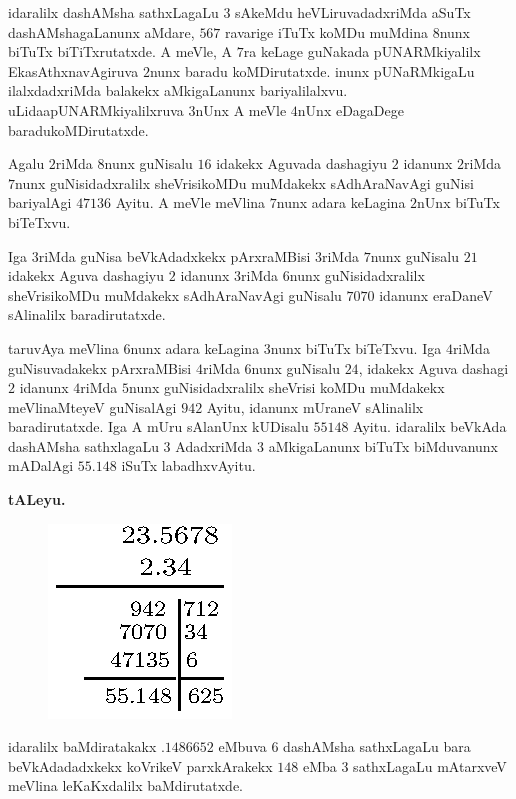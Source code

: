 idaralilx dashAMsha sathxLagaLu $3$ sAkeMdu heVLiruvadadxriMda aSuTx dashAMshagaLanunx aMdare, $567$ ravarige iTuTx koMDu muMdina $8$nunx biTuTx biTiTxrutatxde. A meVle, A $7$ra keLage guNakada pUNARMkiyalilx EkasAthxnavAgiruva $2$nunx baradu koMDirutatxde. inunx pUNaRMkigaLu ilalxdadxriMda balakekx aMkigaLanunx bariyalilalxvu. uLida\break apUNARMkiyalilxruva $3$nUnx A meVle $4$nUnx eDagaDege baradukoMDirutatxde.

Agalu $2$riMda $8$nunx guNisalu $16$ idakekx Aguvada dashagiyu $2$ idanunx $2$riMda $7$nunx guNisidadxralilx sheVrisikoMDu muMdakekx sAdhAraNavAgi guNisi bariyalAgi $47136$ Ayitu. A meVle meVlina $7$nunx adara keLagina $2$nUnx biTuTx biTeTxvu.

Iga $3$riMda guNisa beVkAdadxkekx pArxraMBisi $3$riMda $7$nunx guNisalu $21$ idakekx Aguva dashagiyu $2$ idanunx $3$riMda $6$nunx guNisidadxralilx sheVrisikoMDu muMdakekx sAdhAraNavAgi guNisalu $7070$ idanunx eraDaneV sAlinalilx baradirutatxde.

taruvAya meVlina $6$nunx adara keLagina $3$nunx biTuTx biTeTxvu. Iga $4$riMda guNisuvadakekx pArxraMBisi $4$riMda $6$nunx guNisalu $24$, idakekx Aguva dashagi $2$ idanunx $4$riMda $5$nunx guNisidadxralilx sheVrisi koMDu muMdakekx meVlinaMteyeV guNisalAgi $942$ Ayitu, idanunx mUraneV sAlinalilx baradirutatxde. Iga A mUru sAlanUnx kUDisalu $55148$ Ayitu. idaralilx beVkAda dashAMsha sathxlagaLu $3$ AdadxriMda $3$ aMkigaLanunx biTuTx biMduvanunx mADalAgi $55.148$ iSuTx labadhxvAyitu.

\newpage

\begin{center}
{\bf\large tALeyu.}
\end{center}

\begin{figure}[h]
\centering
\includegraphics[scale=1.3]{4.eps}
\end{figure}


idaralilx baMdiratakakx $.1486652$ eMbuva $6$ dashAMsha sathxLagaLu bara beVkAdadadxkekx koVrikeV parxkArakekx $148$ eMba $3$ sathxLagaLu mAtarxveV meVlina leKaKxdalilx baMdirutatxde.

